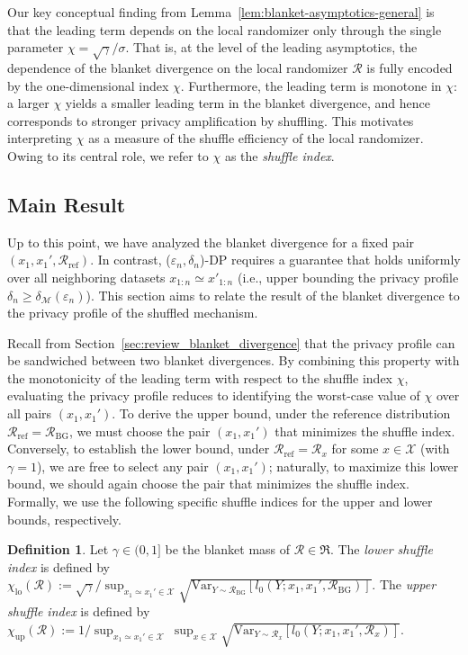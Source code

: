 \documentclass{article}
\theoremstyle{plain}
\theoremstyle{definition}
\newtheorem{definition}{Definition}[section]
\begin{document}
Our key conceptual finding from Lemma~\ref{lem:blanket-asymptotics-general} is that the leading term depends on the local randomizer only through the single parameter
$
  \chi = \sqrt{\gamma}/{\sigma}.
$
That is, at the level of the leading asymptotics, the dependence of the blanket divergence on the local randomizer $\mathcal R$ is fully encoded by the one-dimensional index $\chi$. 
Furthermore, the leading term is monotone in $\chi$: a larger $\chi$ yields a smaller leading term in the blanket divergence, and hence corresponds to stronger privacy amplification by shuffling. 
This motivates interpreting $\chi$ as a measure of the shuffle efficiency of the local randomizer. 
Owing to its central role, we refer to $\chi$ as the \emph{shuffle index}.



\subsection{Main Result}
\label{sec:main_result}
Up to this point, we have analyzed the blanket divergence for a fixed pair $(x_1,x_1',\mathcal{R}_\mathrm{ref})$.  
In contrast, ($\varepsilon_n,\delta_n$)-DP requires a guarantee that holds uniformly over all neighboring datasets $x_{1:n}\simeq x'_{1:n}$ (i.e., upper bounding the privacy profile $\delta_n\geq \delta_\mathcal{M}(\varepsilon_n)$).
This section aims to relate the result of the blanket divergence to the privacy profile of the shuffled mechanism.



Recall from Section~\ref{sec:review_blanket_divergence} that the privacy profile can be sandwiched between two blanket divergences. 
By combining this property with the monotonicity of the leading term with respect to the shuffle index $\chi$, evaluating the privacy profile reduces to identifying the worst-case value of $\chi$ over all pairs $(x_1,x_1')$. 
To derive the upper bound, under the reference distribution $\mathcal R_{\mathrm{ref}} = \mathcal R_{\mathrm{BG}}$, we must choose the pair $(x_1,x_1')$ that minimizes the shuffle index. 
Conversely, to establish the lower bound, under $\mathcal R_{\mathrm{ref}} = \mathcal R_x$ for some $x\in\mathcal X$ (with $\gamma=1$), we are free to select any pair $(x_1,x_1')$; naturally, to maximize this lower bound, we should again choose the pair that minimizes the shuffle index.
Formally, we use the following specific shuffle indices for the upper and lower bounds, respectively.
\begin{definition}
\label{def:shuffle_index}
Let $\gamma\in(0,1]$ be the blanket mass of $\mathcal{R}\in\mathfrak{R}$.
The \emph{lower shuffle index} is defined by
$
  \chi_{\mathrm{lo}}(\mathcal R)
  :=
  \sqrt{\gamma}/\sup_{x_1\simeq x_1'\in\mathcal X}
  \sqrt{
    \mathrm{Var}_{Y\sim \mathcal{R}_{\mathrm{BG}}}
    \!\left[
      l_0\!\left(Y; x_1,x_1',\mathcal{R}_{\mathrm{BG}}\right)
    \right]
  }.
$
The \emph{upper shuffle index} is defined by
$
  \chi_{\mathrm{up}}(\mathcal R)
  :=
  1/\sup_{x_1\simeq x_1'\in\mathcal X}
  \ \sup_{x\in\mathcal{X}}
  \sqrt{
    \mathrm{Var}_{Y\sim \mathcal{R}_{x}}
    \!\left[
      l_0\!\left(Y; x_1,x_1',\mathcal{R}_{x}\right)
    \right]
  }.
$
\end{definition}
\end{document}
